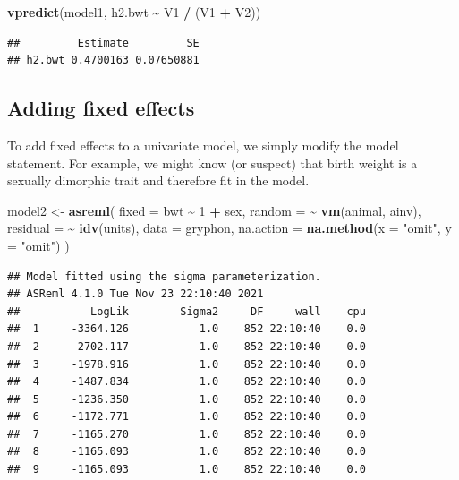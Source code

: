 \documentclass[
  12pt,
]{book}
\newenvironment{Shaded}{\begin{snugshade}}{\end{snugshade}}
\newcommand{\DataTypeTok}[1]{\textcolor[rgb]{0.13,0.29,0.53}{#1}}
\newcommand{\DecValTok}[1]{\textcolor[rgb]{0.00,0.00,0.81}{#1}}
\newcommand{\KeywordTok}[1]{\textcolor[rgb]{0.13,0.29,0.53}{\textbf{#1}}}
\newcommand{\NormalTok}[1]{#1}
\newcommand{\OperatorTok}[1]{\textcolor[rgb]{0.81,0.36,0.00}{\textbf{#1}}}
\newcommand{\StringTok}[1]{\textcolor[rgb]{0.31,0.60,0.02}{#1}}
\begin{document}
\begin{Shaded}
\begin{Highlighting}[]
\KeywordTok{vpredict}\NormalTok{(model1, h2.bwt }\OperatorTok{\textasciitilde{}}\StringTok{ }\NormalTok{V1 }\OperatorTok{/}\StringTok{ }\NormalTok{(V1 }\OperatorTok{+}\StringTok{ }\NormalTok{V2))}
\end{Highlighting}
\end{Shaded}

\begin{verbatim}
##         Estimate         SE
## h2.bwt 0.4700163 0.07650881
\end{verbatim}

\hypertarget{adding-fixed-effects}{%
\subsection{Adding fixed effects}\label{adding-fixed-effects}}

To add fixed effects to a univariate model, we simply modify the model statement. For example, we might know (or suspect) that birth weight is a sexually dimorphic trait and therefore fit in the model.

\begin{Shaded}
\begin{Highlighting}[]
\NormalTok{model2 \textless{}{-}}\StringTok{ }\KeywordTok{asreml}\NormalTok{(}
  \DataTypeTok{fixed =}\NormalTok{ bwt }\OperatorTok{\textasciitilde{}}\StringTok{ }\DecValTok{1} \OperatorTok{+}\StringTok{ }\NormalTok{sex,}
  \DataTypeTok{random =} \OperatorTok{\textasciitilde{}}\StringTok{ }\KeywordTok{vm}\NormalTok{(animal, ainv),}
  \DataTypeTok{residual =} \OperatorTok{\textasciitilde{}}\StringTok{ }\KeywordTok{idv}\NormalTok{(units),}
  \DataTypeTok{data =}\NormalTok{ gryphon,}
  \DataTypeTok{na.action =} \KeywordTok{na.method}\NormalTok{(}\DataTypeTok{x =} \StringTok{"omit"}\NormalTok{, }\DataTypeTok{y =} \StringTok{"omit"}\NormalTok{)}
\NormalTok{)}
\end{Highlighting}
\end{Shaded}

\begin{verbatim}
## Model fitted using the sigma parameterization.
## ASReml 4.1.0 Tue Nov 23 22:10:40 2021
##           LogLik        Sigma2     DF     wall    cpu
##  1     -3364.126           1.0    852 22:10:40    0.0
##  2     -2702.117           1.0    852 22:10:40    0.0
##  3     -1978.916           1.0    852 22:10:40    0.0
##  4     -1487.834           1.0    852 22:10:40    0.0
##  5     -1236.350           1.0    852 22:10:40    0.0
##  6     -1172.771           1.0    852 22:10:40    0.0
##  7     -1165.270           1.0    852 22:10:40    0.0
##  8     -1165.093           1.0    852 22:10:40    0.0
##  9     -1165.093           1.0    852 22:10:40    0.0
\end{verbatim}
\end{document}
